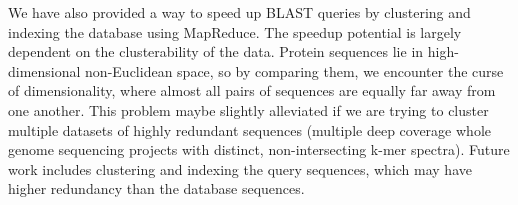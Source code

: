 We have also provided a way to speed up BLAST queries by clustering and indexing the database using MapReduce.
The speedup potential is largely dependent on the clusterability of the data.
Protein sequences lie in high-dimensional non-Euclidean space, so by comparing them, we encounter the curse of dimensionality, where almost all pairs of sequences are equally far away from one another.
This problem maybe slightly alleviated if we are trying to cluster multiple datasets of highly redundant sequences (multiple deep coverage whole genome sequencing projects with distinct, non-intersecting k-mer spectra).
Future work includes clustering and indexing the query sequences, which may have higher redundancy than the database sequences.



